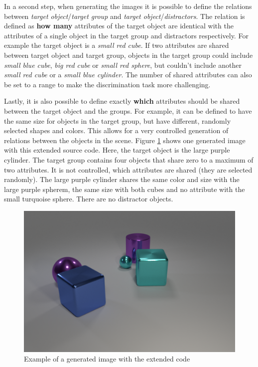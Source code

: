 In a second step, when generating the images it is possible to define the relations between \emph{target object}/\emph{target group} and \emph{target object}/\emph{distractors}.
The relation is defined as \textbf{how many} attributes of the target object are identical with the attributes of a single object in the target group and distractors respectively.
For example the target object is a \emph{small red cube}.
If two attributes are shared between target object and target group, objects in the target group could include \emph{small blue cube}, \emph{big red cube} or \emph{small red sphere}, but couldn't include another \emph{small red cube} or a \emph{small blue cylinder}.
The number of shared attributes can also be set to a range to make the discrimination task more challenging.

Lastly, it is also possible to define exactly \textbf{which} attributes should be shared between the target object and the groups.
For example, it can be defined to have the same size for objects in the target group, but have different, randomly selected shapes and colors.
This allows for a very controlled generation of relations between the objects in the scene.
Figure \ref{fig:clevr-extended_example} shows one generated image with this extended source code.
Here, the target object is the large purple cylinder.
The target group contains four objects that share zero to a maximum of two attributes.
It is not controlled, which attributes are shared (they are selected randomly). The large purple cylinder shares the same color and size with the large purple spherem, the same size with both cubes and no attribute with the small turquoise sphere.
There are no distractor objects.

\begin{figure}[h]
    \centering
    \includegraphics[width=.8\linewidth]{figures/CLEVR_extended_example.png}
    \caption{Example of a generated image with the extended code}
    \label{fig:clevr-extended_example}
\end{figure}


